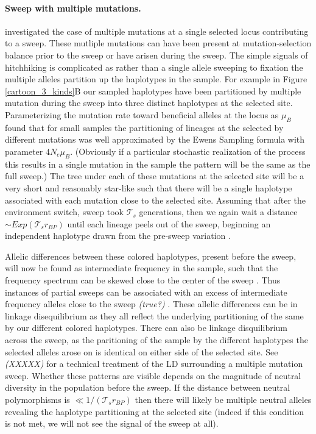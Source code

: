\documentclass[a4paper,10pt]{article}
\newcommand{\gc}[1]{{\it \color{red} (#1)} }
\begin{document}
\paragraph{Sweep with multiple mutations.}
\citet{Pennings2006a, Pennings2006} investigated the case of multiple mutations at a single selected locus contributing to a sweep. These mutliple mutations can have been present at mutation-selection balance prior to the sweep or have arisen during the sweep. The simple signals of hitchhiking is complicated as rather than a single allele sweeping to fixation the multiple alleles partition up the haplotypes in the sample. For example in Figure \ref{cartoon_3_kinds}B our sampled haplotypes have been partitioned by multiple mutation during the sweep into three distinct haplotypes at the selected site. Parameterizing the mutation rate toward beneficial alleles at the locus as $\mu_{B}$\cite {Pennings2006a} found that for small samples the partitioning of lineages at the selected by different mutations was well approximated by the Ewens Sampling formula with parameter $4N_e\mu_B$. (Obviously if a particular stochastic realization of the process this results in a single mutation in the sample the pattern will be the same as the full sweep.) The tree under each of these mutations at the selected site will be a very short and reasonably star-like such that there will be a single haplotype associated with each mutation close to the selected site. Assuming that after the environment switch, sweep took $\mathcal{T}_s$ generations, then we again wait a distance $\sim Exp (\mathcal{T}_s r_{BP})$ until each lineage peels out of the sweep, beginning an independent haplotype drawn from the pre-sweep variation \citep{Pennings2006}. 

Allelic differences between these colored haplotypes, present before the sweep, will now be found as intermediate frequency in the sample, such that the frequency spectrum can be skewed close to the center of the sweep \citep{Pennings2006}. Thus instances of partial sweeps can be associated with an excess of intermediate frequency alleles close to the sweep \gc{true?}. These allelic differences can be in linkage disequilibrium as they all reflect the underlying partitioning of the same by our different colored haplotypes. There can also be linkage disquilibrium across the sweep, as the paritioning of the sample by the different haplotypes the selected alleles arose on is identical on either side of the selected site. See \gc{XXXXX} for a technical treatment of the LD surrounding a multiple mutation sweep. Whether these patterns are visible depends on the magnitude of neutral diversity in the population before the sweep. If the distance between neutral polymorphisms is $\ll 1/(\mathcal{T}_s r_{BP})$ then there will likely be multiple neutral alleles revealing the haplotype partitioning at the selected site (indeed if this condition is not met, we will not see the signal of the sweep at all).
\end{document}
